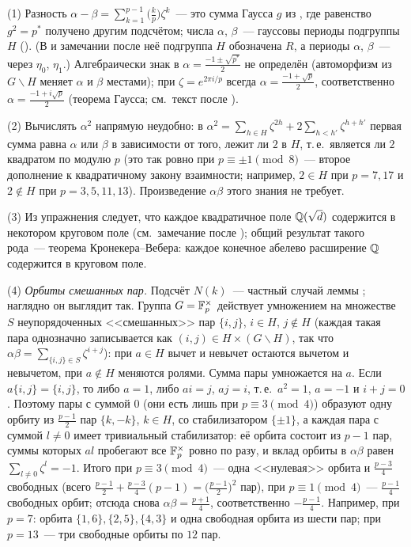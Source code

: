 \begin{remark}
(1) Разность $\alpha-\beta=\sum_{k=1}^{p-1}\bigl(\frac kp\bigr)\zeta^k$~--- это сумма Гаусса $g$ из , где равенство
$g^2=p^*$ получено другим подсчётом; числа $\alpha$, $\beta$~--- гауссовы периоды подгруппы $H$ (). (В 
и замечании после неё подгруппа $H$ обозначена $R$, а периоды $\alpha$, $\beta$~--- через $\eta_0$, $\eta_1$.)
Алгебраически знак в $\alpha=\frac{-1\pm\sqrt{p^*}}2$ не определён (автоморфизм из $G\smallsetminus H$ меняет $\alpha$ и
$\beta$ местами); при $\zeta=e^{2\pi i/p}$ всегда $\alpha=\frac{-1+\sqrt p}2$, соответственно $\alpha=\frac{-1+i\sqrt p}2$
(теорема Гаусса; см.\ текст после ).

(2) Вычислять $\alpha^2$ напрямую неудобно: в $\alpha^2=\sum_{h\in H}\zeta^{2h}+2\sum_{h<h'}\zeta^{h+h'}$ первая сумма равна
$\alpha$ или $\beta$ в зависимости от того, лежит ли $2$ в $H$, т.\,е.\ является ли $2$ квадратом по модулю $p$ (это так ровно
при $p\equiv\pm1\pmod8$~--- второе дополнение к квадратичному закону взаимности; например, $2\in H$ при $p=7,17$ и $2\notin H$
при $p=3,5,11,13$). Произведение $\alpha\beta$ этого знания не требует.

(3) Из упражнения следует, что каждое квадратичное поле $\mathbb Q(\sqrt d)$ содержится в некотором круговом поле (см.\ замечание
после ); общий результат такого рода~--- теорема Кронекера--Вебера: каждое конечное абелево расширение $\mathbb Q$
содержится в круговом поле.

(4) \emph{Орбиты смешанных пар.} Подсчёт $N(k)$~--- частный случай леммы ; наглядно он выглядит так. Группа
$G=\mathbb F_p^\times$ действует умножением на множестве $S$ неупорядоченных <<смешанных>> пар $\{i,j\}$, $i\in H$, $j\notin H$
(каждая такая пара однозначно записывается как $(i,j)\in H\times(G\smallsetminus H)$, так что
$\alpha\beta=\sum_{\{i,j\}\in S}\zeta^{i+j}$): при $a\in H$ вычет и невычет остаются вычетом и невычетом, при $a\notin H$
меняются ролями. Сумма пары умножается на $a$. Если $a\{i,j\}=\{i,j\}$, то либо $a=1$, либо $ai=j$, $aj=i$, т.\,е.\
$a^2=1$, $a=-1$ и $i+j=0$. Поэтому пары с суммой $0$ (они есть лишь при $p\equiv3\pmod4$) образуют одну орбиту из
$\frac{p-1}2$ пар $\{k,-k\}$, $k\in H$, со стабилизатором $\{\pm1\}$, а каждая пара с суммой $l\ne0$ имеет тривиальный
стабилизатор: её орбита состоит из $p-1$ пар, суммы которых $al$ пробегают все $\mathbb F_p^\times$ ровно по разу, и вклад орбиты в
$\alpha\beta$ равен $\sum_{l\ne0}\zeta^l=-1$. Итого при $p\equiv3\pmod4$~--- одна <<нулевая>> орбита и $\frac{p-3}4$
свободных (всего $\frac{p-1}2+\frac{p-3}4(p-1)=\bigl(\frac{p-1}2\bigr)^2$ пар), при $p\equiv1\pmod4$~--- $\frac{p-1}4$
свободных орбит; отсюда снова $\alpha\beta=\frac{p+1}4$, соответственно $-\frac{p-1}4$. Например, при $p=7$: орбита
$\{1,6\},\{2,5\},\{4,3\}$ и одна свободная орбита из шести пар; при $p=13$~--- три свободные орбиты по $12$ пар.
\end{remark}

